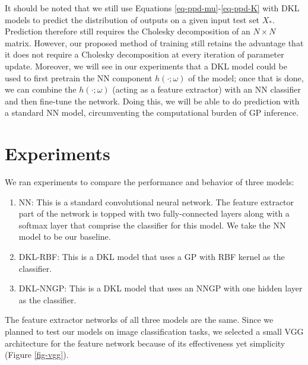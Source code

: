 \documentclass{article}
\begin{document}
It should be noted that we still use Equations \ref{eq-ppd-mu}-\ref{eq-ppd-K} with DKL models to predict the distribution of outputs on a given input test set $X_*$. Prediction therefore still requires the Cholesky decomposition of an $N\times N$ matrix. However, our proposed method of training still retains the advantage that it does not require a Cholesky decomposition at every iteration of parameter update. Moreover, we will see in our experiments that a DKL model could be used to first pretrain the NN component $h(\cdot; \omega)$ of the model; once that is done, we can combine the $h(\cdot; \omega)$ (acting as a feature extractor) with an NN classifier and then fine-tune the network. Doing this, we will be able to do prediction with a standard NN model, circumventing the computational burden of GP inference.

\section{Experiments}

We ran experiments to compare the performance and behavior of three models:
\begin{enumerate}
\item NN: This is a standard convolutional neural network. The feature extractor part of the network is topped with two fully-connected layers along with a softmax layer that comprise the classifier for this model. We take the NN model to be our baseline.
\item DKL-RBF: This is a DKL model that uses a GP with RBF kernel as the classifier.
\item DKL-NNGP: This is a DKL model that uses an NNGP with one hidden layer as the classifier.
\end{enumerate}
The feature extractor networks of all three models are the same. Since we planned to test our models on image classification tasks, we selected a small VGG architecture for the feature network because of its effectiveness yet simplicity (Figure \ref{fig-vgg}).
\end{document}
